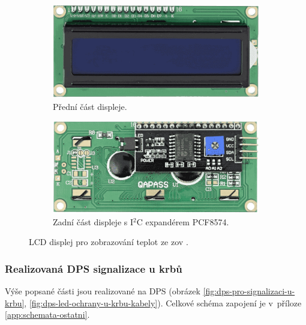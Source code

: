 \begin{figure}[H]
\centering
\begin{subfigure}{.5\textwidth}
  \centering
  \includegraphics[width=0.91\linewidth]{images/krb/predni-cast-lcd-displeje.png}
  \caption{Přední část displeje.}
  \label{fig:predni-cast-lcd-displeje}
\end{subfigure}%
\begin{subfigure}{.5\textwidth}
  \centering
  \includegraphics[width=0.9\linewidth]{images/krb/zadni-cast-lcd-displeje-s-expanderem-pcf8574.png}
  \caption{Zadní část displeje s I$^2$C expandérem PCF8574.}
  \label{fig:zadni-cast-lcd-displeje-s-expanderem-pcf857}
\end{subfigure}
\caption[LCD displej pro zobrazování teplot ze \acrshort{zov}.]{LCD displej pro zobrazování teplot ze \acrshort{zov} \cite{lcd-displej}.}
\label{fig:lcd-displej}
\end{figure}

\subsubsection{Realizovaná DPS signalizace u krbů}
Výše popsané části jsou realizované na DPS (obrázek \ref{fig:dps-pro-signalizaci-u-krbu}, \ref{fig:dps-led-ochrany-u-krbu-kabely}). Celkové schéma zapojení je v~příloze \ref{app:schemata-ostatni}.




